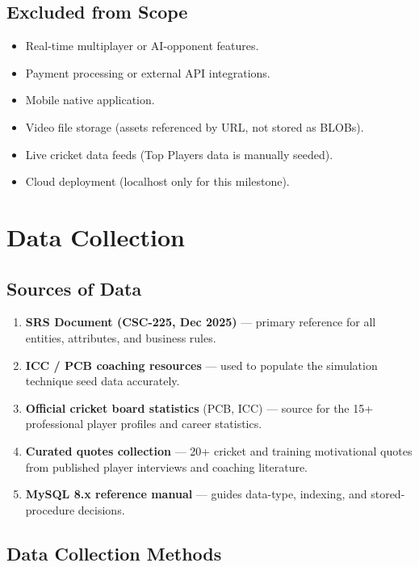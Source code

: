 \documentclass[12pt,a4paper]{article}
\begin{document}
\subsection{Excluded from Scope}

\begin{itemize}[leftmargin=1.5em]
    \item Real-time multiplayer or AI-opponent features.
    \item Payment processing or external API integrations.
    \item Mobile native application.
    \item Video file storage (assets referenced by URL, not stored as BLOBs).
    \item Live cricket data feeds (Top Players data is manually seeded).
    \item Cloud deployment (localhost only for this milestone).
\end{itemize}

\section{Data Collection}

\subsection{Sources of Data}

\begin{enumerate}[leftmargin=1.5em]
    \item \textbf{SRS Document (CSC-225, Dec 2025)} --- primary reference for all
    entities, attributes, and business rules.
    \item \textbf{ICC / PCB coaching resources} --- used to populate the simulation
    technique seed data accurately.
    \item \textbf{Official cricket board statistics} (PCB, ICC) --- source for the
    15+ professional player profiles and career statistics.
    \item \textbf{Curated quotes collection} --- 20+ cricket and training motivational
    quotes from published player interviews and coaching literature.
    \item \textbf{MySQL 8.x reference manual} --- guides data-type, indexing, and
    stored-procedure decisions.
\end{enumerate}

\subsection{Data Collection Methods}
\end{document}
